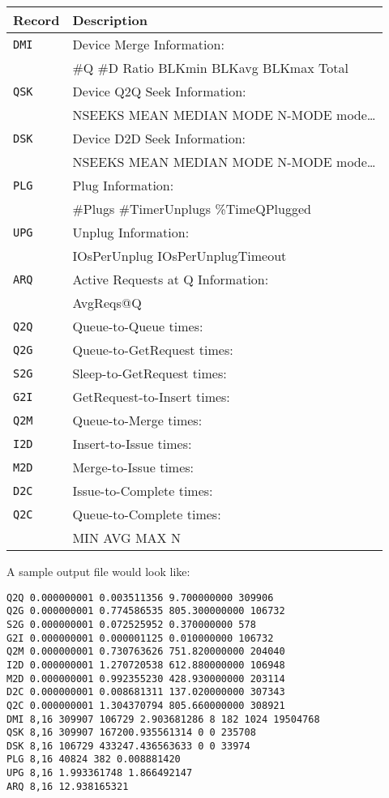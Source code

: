 \documentclass{article}
\begin{document}
  \bigskip
  \begin{tabular}{|l|l|}\hline
  \textbf{Record} & \textbf{Description}\\\hline
  \texttt{DMI}	& Device Merge Information:\\
		& \#Q \#D Ratio BLKmin BLKavg BLKmax Total\\\hline
  \texttt{QSK}	& Device Q2Q Seek Information:\\
		& NSEEKS MEAN MEDIAN MODE N-MODE mode\ldots\\\hline
  \texttt{DSK}	& Device D2D Seek Information:\\
		& NSEEKS MEAN MEDIAN MODE N-MODE mode\ldots\\\hline
  \texttt{PLG}	& Plug Information:\\
		& \#Plugs \#TimerUnplugs \%TimeQPlugged\\\hline
  \texttt{UPG}	& Unplug Information:\\
		& IOsPerUnplug IOsPerUnplugTimeout\\\hline
  \texttt{ARQ}	& Active Requests at Q Information:\\
  		& AvgReqs@Q\\\hline\hline
  \texttt{Q2Q}  & Queue-to-Queue times:\\
  \texttt{Q2G}  & Queue-to-GetRequest times:\\
  \texttt{S2G}  & Sleep-to-GetRequest times:\\
  \texttt{G2I}  & GetRequest-to-Insert times:\\
  \texttt{Q2M}  & Queue-to-Merge times:\\
  \texttt{I2D}  & Insert-to-Issue times:\\
  \texttt{M2D}  & Merge-to-Issue times:\\
  \texttt{D2C}  & Issue-to-Complete times:\\
  \texttt{Q2C}  & Queue-to-Complete times:\\
                & MIN AVG MAX N\\\hline
  \end{tabular}

  \bigskip
  A sample output file would look like:

  \begin{verbatim}
Q2Q 0.000000001 0.003511356 9.700000000 309906
Q2G 0.000000001 0.774586535 805.300000000 106732
S2G 0.000000001 0.072525952 0.370000000 578
G2I 0.000000001 0.000001125 0.010000000 106732
Q2M 0.000000001 0.730763626 751.820000000 204040
I2D 0.000000001 1.270720538 612.880000000 106948
M2D 0.000000001 0.992355230 428.930000000 203114
D2C 0.000000001 0.008681311 137.020000000 307343
Q2C 0.000000001 1.304370794 805.660000000 308921
DMI 8,16 309907 106729 2.903681286 8 182 1024 19504768
QSK 8,16 309907 167200.935561314 0 0 235708
DSK 8,16 106729 433247.436563633 0 0 33974
PLG 8,16 40824 382 0.008881420
UPG 8,16 1.993361748 1.866492147
ARQ 8,16 12.938165321
  \end{verbatim}
\end{document}

